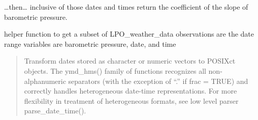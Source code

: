 \documentclass[
  11pt,
]{article}
\newenvironment{Shaded}{\begin{snugshade}}{\end{snugshade}}
\newcommand{\AttributeTok}[1]{\textcolor[rgb]{0.77,0.63,0.00}{#1}}
\newcommand{\ControlFlowTok}[1]{\textcolor[rgb]{0.13,0.29,0.53}{\textbf{#1}}}
\newcommand{\FunctionTok}[1]{\textcolor[rgb]{0.00,0.00,0.00}{#1}}
\newcommand{\NormalTok}[1]{#1}
\newcommand{\OtherTok}[1]{\textcolor[rgb]{0.56,0.35,0.01}{#1}}
\newcommand{\SpecialCharTok}[1]{\textcolor[rgb]{0.00,0.00,0.00}{#1}}
\begin{document}
\ldots then\ldots{} inclusive of those dates and times return the
coefficient of the slope of barometric pressure.

helper function to get a subset of LPO\_weather\_data observations are
the date range variables are barometric pressure, date, and time

\begin{quote}
Transform dates stored as character or numeric vectors to POSIXct
objects. The ymd\_hms() family of functions recognizes all
non-alphanumeric separators (with the exception of ``.'' if frac = TRUE)
and correctly handles heterogeneous date-time representations. For more
flexibility in treatment of heterogeneous formats, see low level parser
parse\_date\_time().
\end{quote}

\begin{Shaded}
\end{Shaded}
\end{document}
